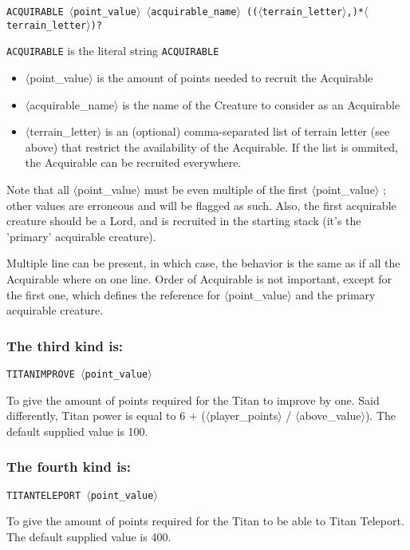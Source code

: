 \documentclass{article}
\begin{document}
\texttt{\texttt{ACQUIRABLE} $\langle$point\_value$\rangle$ $\langle$acquirable\_name$\rangle$ (($\langle$terrain\_letter$\rangle$,)*$\langle$terrain\_letter$\rangle$)?}

\texttt{ACQUIRABLE} is the literal string \texttt{ACQUIRABLE}

\begin{itemize}
\item $\langle$point\_value$\rangle$ is the amount of points needed to recruit the Acquirable
\item $\langle$acquirable\_name$\rangle$ is the name of the Creature to consider as an Acquirable
\item $\langle$terrain\_letter$\rangle$ is an (optional) comma-separated list of terrain letter (see above) that restrict the availability of the Acquirable. If the list is ommited, the Acquirable can be recruited everywhere.
\end{itemize}

Note that all $\langle$point\_value$\rangle$ must be even multiple of the first $\langle$point\_value$\rangle$ ; other values are erroneous and will be flagged as such. Also, the first acquirable creature should be a Lord, and is recruited in the starting stack (it's the 'primary' acquirable creature).

Multiple line can be present, in which case, the behavior is the same as if all the Acquirable where on one line. Order of Acquirable is not important, except for the first one, which defines the reference for $\langle$point\_value$\rangle$ and the primary acquirable creature.

\subsubsection*{The third kind is:}

\texttt{TITANIMPROVE $\langle$point\_value$\rangle$}

To give the amount of points required for the Titan to improve by one. Said differently, Titan power is equal to 6 + ($\langle$player\_points$\rangle$ / $\langle$above\_value$\rangle$). The default supplied value is 100.

\subsubsection*{The fourth kind is:}

\texttt{TITANTELEPORT $\langle$point\_value$\rangle$}

To give the amount of points required for the Titan to be able to Titan Teleport. The default supplied value is 400.
\end{document}
